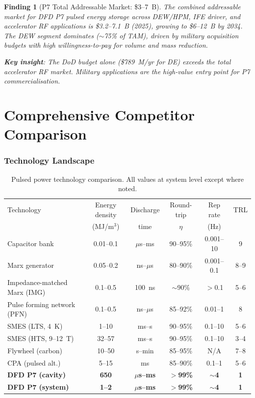 \documentclass[11pt]{article}
\newtheorem{finding}{Finding}
\begin{document}
\begin{finding}[P7 Total Addressable Market: \$3--7~B]
\label{find:TAM}
The combined addressable market for DFD P7 pulsed energy storage across
DEW/HPM, IFE driver, and accelerator RF applications is \$3.2--7.1~B
(2025), growing to \$6--12~B by 2034. The DEW segment dominates
($\sim$75\% of TAM), driven by military acquisition budgets with high
willingness-to-pay for volume and mass reduction.

\textbf{Key insight}: The DoD budget alone (\$789~M/yr for DE) exceeds
the total accelerator RF market. Military applications are the
high-value entry point for P7 commercialisation.
\end{finding}

\part{Comprehensive Competitor Comparison}
\label{part:comparison}

\section{Technology Landscape}

\begin{table}[h]
\centering
\caption{Pulsed power technology comparison. All values at system level
  except where noted.}
\label{tab:comparison}
\begin{tabular}{@{}p{2.5cm}ccccc@{}}
\toprule
Technology & Energy density & Discharge & Round-trip & Rep rate & TRL \\
 & (MJ/m$^3$) & time & $\eta$ & (Hz) & \\
\midrule
Capacitor bank & 0.01--0.1 & $\mu$s--ms & 90--95\% & 0.001--10 & 9 \\
Marx generator & 0.05--0.2 & ns--$\mu$s & 80--90\% & 0.001--0.1 & 8--9 \\
Impedance-matched Marx (IMG) & 0.1--0.5 & 100~ns & $\sim$90\% & $>$0.1 & 5--6 \\
Pulse forming network (PFN) & 0.1--0.5 & ns--$\mu$s & 85--92\% & 0.01--1 & 8 \\
SMES (LTS, 4~K) & 1--10 & ms--s & 90--95\% & 0.1--10 & 5--6 \\
SMES (HTS, 9--12~T) & 32--57 & ms--s & 90--95\% & 0.1--10 & 3--4 \\
Flywheel (carbon) & 10--50 & s--min & 85--95\% & N/A & 7--8 \\
CPA (pulsed alt.) & 5--15 & ms & 85--90\% & 0.1--1 & 5--6 \\
\midrule
\textbf{DFD P7 (cavity)} & \textbf{650} & \textbf{$\mu$s--ms} & \textbf{$>$99\%} & \textbf{$\sim$4} & \textbf{1} \\
\textbf{DFD P7 (system)} & \textbf{1--2} & \textbf{$\mu$s--ms} & \textbf{$>$99\%} & \textbf{$\sim$4} & \textbf{1} \\
\bottomrule
\end{tabular}
\end{table}
\end{document}
